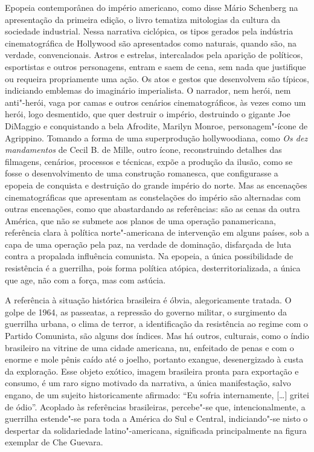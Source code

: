 Epopeia contemporânea do império americano, como disse Mário Schenberg
na apresentação da primeira edição, o livro tematiza mitologias da
cultura da sociedade industrial. Nessa narrativa ciclópica, os tipos
gerados pela indústria cinematográfica de Hollywood são apresentados
como naturais, quando são, na verdade, convencionais. Astros e estrelas,
intercalados pela aparição de políticos, esportistas e outros
personagens, entram e saem de cena, sem nada que justifique ou requeira
propriamente uma ação. Os atos e gestos que desenvolvem são típicos,
indiciando emblemas do imaginário imperialista. O narrador, nem herói,
nem anti"-herói, vaga por camas e outros cenários cinematográficos, às
vezes como um herói, logo desmentido, que quer destruir o império,
destruindo o gigante Joe DiMaggio e conquistando a bela Afrodite,
Marilyn Monroe, personagem"-ícone de Agrippino. Tomando a forma de uma
superprodução hollywoodiana, como \emph{Os dez mandamentos} de Cecil B.
de Mille, outro ícone, reconstruindo detalhes das filmagens, cenários,
processos e técnicas, expõe a produção da ilusão, como se fosse o
desenvolvimento de uma construção romanesca, que configurasse a epopeia
de conquista e destruição do grande império do norte. Mas as encenações
cinematográficas que apresentam as constelações do império são
alternadas com outras encenações, como que abastardando as referências:
são as cenas da outra América, que não se submete aos planos de uma
operação panamericana, referência clara à política norte"-americana de
intervenção em alguns países, sob a capa de uma operação pela paz, na
verdade de dominação, disfarçada de luta contra a propalada influência
comunista. Na epopeia, a única possibilidade de resistência é a
guerrilha, pois forma política atópica, desterritorializada, a única que
age, não com a força, mas com astúcia.

A referência à situação histórica brasileira é óbvia, alegoricamente
tratada. O golpe de 1964, as passeatas, a repressão do governo militar,
o surgimento da guerrilha urbana, o clima de terror, a identificação da
resistência ao regime com o Partido Comunista, são alguns dos índices.
Mas há outros, culturais, como o índio brasileiro na vitrine de uma
cidade americana, nu, enfeitado de penas e com o enorme e mole pênis
caído até o joelho, portanto exangue, desenergizado à custa da
exploração. Esse objeto exótico, imagem brasileira pronta para
exportação e consumo, é um raro signo motivado da narrativa, a única
manifestação, salvo engano, de um sujeito historicamente afirmado: ``Eu
sofria internamente, {[}\ldots{}{]} gritei de ódio''. Acoplado às referências
brasileiras, percebe"-se que, intencionalmente, a guerrilha estende"-se
para toda a América do Sul e Central, indiciando"-se nisto o despertar da
solidariedade latino"-americana, significada principalmente na figura
exemplar de Che Guevara.


